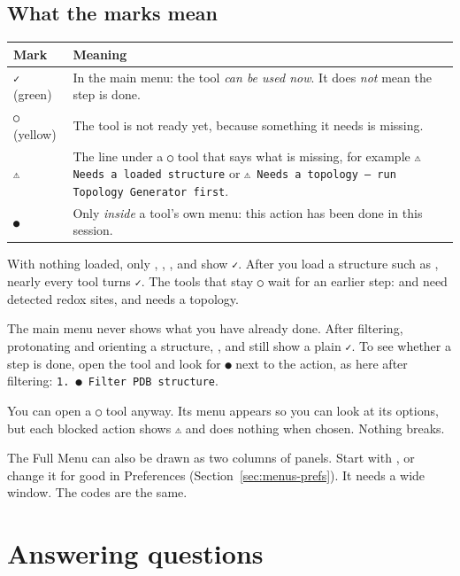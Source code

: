 \subsection*{What the marks mean}

\begin{tabularx}{\linewidth}{@{}lL@{}}
\toprule
\textbf{Mark} & \textbf{Meaning} \\
\midrule
\texttt{✓} (green) & In the main menu: the tool \emph{can be used now}. It
does \emph{not} mean the step is done. \\
\texttt{○} (yellow) & The tool is not ready yet, because something it needs is
missing. \\
\texttt{⚠} & The line under a \texttt{○} tool that says what is missing, for
example \texttt{⚠ Needs a loaded structure} or
\texttt{⚠ Needs a topology — run Topology Generator first}. \\
\texttt{●} & Only \emph{inside} a tool's own menu: this action has been done
in this session. \\
\bottomrule
\end{tabularx}

\medskip
With nothing loaded, only , , ,  and 
show \texttt{✓}. After you load a structure such as , nearly every
tool turns \texttt{✓}. The tools that stay \texttt{○} wait for an earlier step:
 and  need detected redox sites, and  needs a topology.

\begin{watchout}
The main menu never shows what you have already done. After filtering,
protonating and orienting a structure, ,  and  still
show a plain \texttt{✓}. To see whether a step is done, open the tool and look
for \texttt{●} next to the action, as here after filtering:
\texttt{1.~● Filter PDB structure}.
\end{watchout}

You can open a \texttt{○} tool anyway. Its menu appears so you can look at its
options, but each blocked action shows \texttt{⚠} and does nothing when chosen.
Nothing breaks.

\begin{tip}
The Full Menu can also be drawn as two columns of panels. Start with
, or change it for good in Preferences
(Section~\ref{sec:menus-prefs}). It needs a wide window. The codes are the same.
\end{tip}

\section{Answering questions}\label{sec:menus-prompts}

